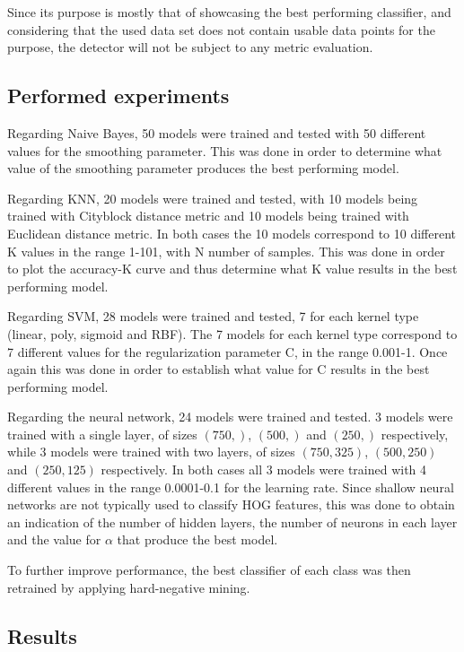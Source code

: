 \documentclass[journal,twocolumn]{IEEEtran}
\begin{document}
Since its purpose is mostly that of showcasing the best performing classifier, and considering that the used data set does not contain usable data points for the purpose, the detector will not be subject to any metric evaluation.

\subsection{Performed experiments}

Regarding Naive Bayes, 50 models were trained and tested with 50 different values for the smoothing parameter. This was done in order to determine what value of the smoothing parameter produces the best performing model.

Regarding KNN, 20 models were trained and tested, with 10 models being trained with Cityblock distance metric and 10 models being trained with Euclidean distance metric. In both cases the 10 models correspond to 10 different K values in the range 1-101, with N number of samples. This was done in order to plot the accuracy-K curve and thus determine what K value results in the best performing model.

Regarding SVM, 28 models were trained and tested, 7 for each kernel type (linear, poly, sigmoid and RBF). The 7 models for each kernel type correspond to 7 different values for the regularization parameter C, in the range 0.001-1. Once again this was done in order to establish what value for C results in the best performing model.

Regarding the neural network, 24 models were trained and tested. 3 models were trained with a single layer, of sizes $(750,)$, $(500,)$ and $(250,)$ respectively, while 3 models were trained with two layers, of sizes $(750,325)$, $(500,250)$ and $(250,125)$ respectively. In both cases all 3 models were trained with 4 different values in the range 0.0001-0.1 for the learning rate. Since shallow neural networks are not typically used to classify HOG features, this was done to obtain an indication of the number of hidden layers, the number of neurons in each layer and the value for $\alpha$ that produce the best model.

To further improve performance, the best classifier of each class was then retrained by applying hard-negative mining.

\subsection{Results}
\end{document}

